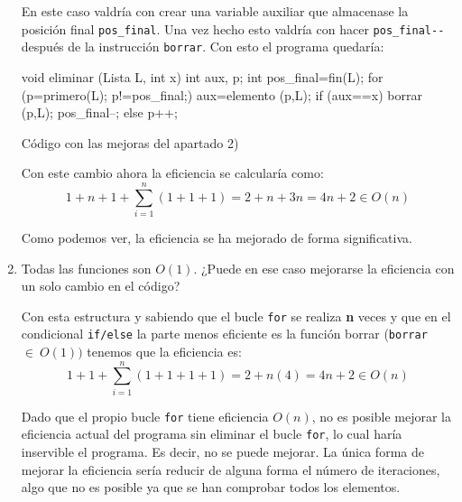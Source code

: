 \begin{ejercicio}
\begin{enumerate}
        En este caso valdría con crear una variable auxiliar que almacenase la posición final \verb|pos_final|. Una vez hecho esto valdría con hacer \verb|pos_final--| después de la instrucción \verb|borrar|. Con esto el programa quedaría:
        
        \begin{listing}[H]
        \begin{cppcode}
void eliminar (Lista L, int x){
    int aux, p;
    int pos_final=fin(L);
    for (p=primero(L); p!=pos_final;){
        aux=elemento (p,L);
        if (aux==x){
            borrar (p,L);
            pos_final--;
        }
        else p++;
    }
}
        \end{cppcode}
        \caption{Código con las mejoras del apartado 2)}
        \end{listing}


        Con este cambio ahora la eficiencia se calcularía como:
        \[
        1+n+1+ \sum_{i=1}^n (1+1+1) = 2 + n + 3n = 4n + 2 \in O(n)
        \]

        Como podemos ver, la eficiencia se ha mejorado de forma significativa.

        \item Todas las funciones son $O(1)$. ¿Puede en ese caso mejorarse la eficiencia con un solo cambio en el código?

        Con esta estructura y sabiendo que el bucle \verb|for| se realiza \textbf{n} veces y que en el condicional \verb|if/else| la parte menos eficiente es la función borrar (\verb|borrar|~$\in~O(1))$ tenemos que la eficiencia es:
        \[
        1+1+ \sum_{i=1}^n (1+1+1+1) = 2 + n(4) = 4n + 2 \in O(n)
        \]
        
        Dado que el propio bucle \verb|for| tiene eficiencia $O(n)$, no es posible mejorar la eficiencia actual del programa sin eliminar el bucle \verb|for|, lo cual haría inservible el programa. Es decir, no se puede mejorar. La única forma de mejorar la eficiencia sería reducir de alguna forma el número de iteraciones, algo que no es posible ya que se han comprobar todos los elementos.
    \end{enumerate}
\end{ejercicio}